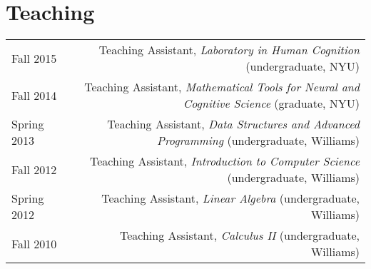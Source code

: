 \documentclass[12pt]{my_cv}
\begin{document}
\section{Teaching}
\begin{tabular}{L R}
Fall 2015 & Teaching Assistant, \emph{Laboratory in Human Cognition} (undergraduate, NYU)\\ [0.5ex]
Fall 2014&Teaching Assistant, \emph{Mathematical Tools for Neural and Cognitive Science} (graduate, NYU)\\ [0.5ex]
Spring 2013&Teaching Assistant, \emph{Data Structures and Advanced Programming} (undergraduate, Williams)\\[0.5ex]
Fall 2012&Teaching Assistant, \emph{Introduction to Computer Science} (undergraduate, Williams)\\[0.5ex]
Spring 2012&Teaching Assistant, \emph{Linear Algebra} (undergraduate, Williams)\\[0.5ex]
Fall 2010&Teaching Assistant, \emph{Calculus II} (undergraduate, Williams)\\[0.5ex]
\end{tabular}
\end{document}
